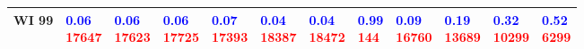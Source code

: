 \begin{tabular}{llllllllllll}
WI 99  &  \makecell{\textcolor{blue}{0.06} \\ \textcolor{red}{17647}} &  \makecell{\textcolor{blue}{0.06} \\ \textcolor{red}{17623}} &  \makecell{\textcolor{blue}{0.06} \\ \textcolor{red}{17725}} &  \makecell{\textcolor{blue}{0.07} \\ \textcolor{red}{17393}} &  \makecell{\textcolor{blue}{0.04} \\ \textcolor{red}{18387}} &  \makecell{\textcolor{blue}{0.04} \\ \textcolor{red}{18472}} &   \makecell{\textcolor{blue}{0.99} \\ \textcolor{red}{144}} &  \makecell{\textcolor{blue}{0.09} \\ \textcolor{red}{16760}} &  \makecell{\textcolor{blue}{0.19} \\ \textcolor{red}{13689}} &  \makecell{\textcolor{blue}{0.32} \\ \textcolor{red}{10299}} &   \makecell{\textcolor{blue}{0.52} \\ \textcolor{red}{6299}} \\
\bottomrule
\end{tabular}
